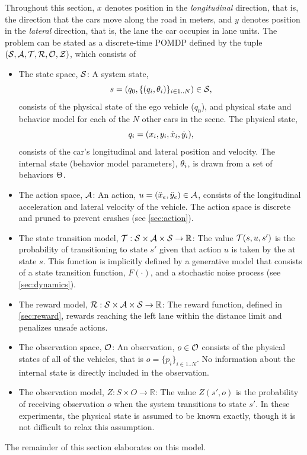 Throughout this section, $x$ denotes position in the \emph{longitudinal} direction, that is, the direction that the cars move along the road in meters, and $y$ denotes position in the \emph{lateral} direction, that is, the lane the car occupies in lane units.
The problem can be stated as a discrete-time POMDP defined by the tuple $(\mathcal{S}, \mathcal{A}, \mathcal{T}, \mathcal{R}, \mathcal{O}, \mathcal{Z})$, which consists of

\begin{itemize}
    \item The state space, $\mathcal{S}$: A system state, $$s = (q_0, \{({q}_i,{\theta}_i)\}_{i \in 1..N}) \in \mathcal{S}\text{,}$$ consists of the physical state of the ego vehicle ($q_0$), and physical state and behavior model for each of the $N$ other cars in the scene.
The physical state, $${q}_i = ({x}_i,{y}_i,{\dot{x}}_i,{\dot{y}}_i)\text{,}$$ consists of the car's longitudinal and lateral position and velocity. The internal state (behavior model parameters), ${\theta}_i$, is drawn from a set of behaviors $\Theta$.
    \item The action space, $\mathcal{A}$: An action, $u = ({\ddot{x}}_e, {\ddot{y}}_e) \in \mathcal{A}$, consists of the longitudinal acceleration and lateral velocity of the \av{} vehicle. The action space is discrete and pruned to prevent crashes (see \cref{sec:action}).
    \item The state transition model, $\mathcal{T}: \mathcal{S} \times \mathcal{A} \times \mathcal{S} \to \mathbb{R}$: The value $\mathcal{T}(s,u,s')$ is the probability of transitioning to state $s'$ given that action $u$ is taken by the \av{} at state $s$. This function is implicitly defined by a generative model that consists of a state transition function, $F(\cdot)$, and a stochastic noise process (see \cref{sec:dynamics}).
    \item The reward model, $\mathcal{R}:\mathcal{S} \times \mathcal{A} \times \mathcal{S} \to \mathbb{R}$: The reward function, defined in \cref{sec:reward}, rewards reaching the left lane within the distance limit and penalizes unsafe actions.
    \item The observation space, $\mathcal{O}$: An observation, $o \in \mathcal{O}$ consists of the physical states of all of the vehicles, that is $o=\{p_i\}_{i \in 1..N}$. No information about the internal state is directly included in the observation.
    \item The observation model, $Z: S \times O \to \mathbb{R}$: The value $Z(s',o)$ is the probability of receiving observation $o$ when the system transitions to state $s'$. In these experiments, the physical state is assumed to be known exactly, though it is not difficult to relax this assumption. %
\end{itemize}
The remainder of this section elaborates on this model.

